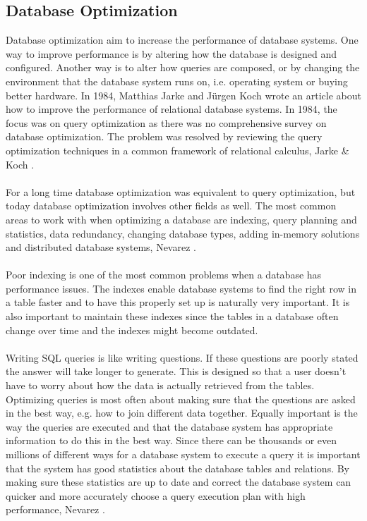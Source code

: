 \documentclass{cslthse-msc}
\begin{document}
\subsection{Database Optimization}
Database optimization aim to increase the performance of database systems. One way to improve performance is by altering how the database is designed and configured. Another way is to alter how queries are composed, or by changing the environment that the database system runs on, i.e. operating system or buying better hardware. In 1984, Matthias Jarke and Jürgen Koch \cite{jarke1984query} wrote an article about how to improve the performance of relational database systems. In 1984, the focus was on query optimization as there was no comprehensive survey on database optimization. The problem was resolved by reviewing the query optimization techniques in a common framework of relational calculus, Jarke \& Koch \cite{jarke1984query}.\\\\
For a long time database optimization was equivalent to query optimization, but today database optimization involves other fields as well. The most common areas to work with when optimizing a database are indexing, query planning and statistics, data redundancy, changing database types, adding in-memory solutions and distributed database systems, Nevarez \cite{Nevarez}.\\\\
Poor indexing is one of the most common problems when a database has performance issues. The indexes enable database systems to find the right row in a table faster and to have this properly set up is naturally very important. It is also important to maintain these indexes since the tables in a database often change over time and the indexes might become outdated.\\\\
Writing SQL queries is like writing questions. If these questions are poorly stated the answer will take longer to generate. This is designed so that a user doesn't have to worry about how the data is actually retrieved from the tables. Optimizing queries is most often about making sure that the questions are asked in the best way, e.g. how to join different data together. Equally important is the way the queries are executed and that the database system has appropriate information to do this in the best way. Since there can be thousands or even millions of different ways for a database system to execute a query it is important that the system has good statistics about the database tables and relations. By making sure these statistics are up to date and correct the database system can quicker and more accurately choose a query execution plan with high performance, Nevarez \cite{Nevarez}.\\\\
\end{document}
